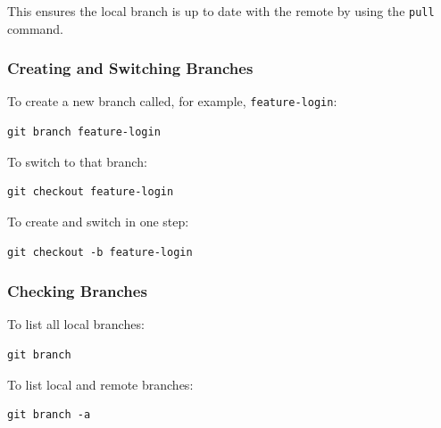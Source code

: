 \documentclass{article}
\newcommand{\codecmd}[1]{\textcolor[rgb]{0,0.5,0}{\texttt{#1}}}
\begin{document}
\noindent This ensures the local branch is up to date with the remote by using the \codecmd{pull} command.

\subsubsection{Creating and Switching Branches}

To create a new branch called, for example, \codecmd{feature-login}:

\begin{tcolorbox}[colback=mintgreen, colframe=green!40!black, boxrule=0.5pt, sharp corners]
\begin{verbatim}
git branch feature-login
\end{verbatim}
\end{tcolorbox}

\noindent To switch to that branch:

\begin{tcolorbox}[colback=mintgreen, colframe=green!40!black, boxrule=0.5pt, sharp corners]
\begin{verbatim}
git checkout feature-login
\end{verbatim}
\end{tcolorbox}

\noindent To create and switch in one step:

\begin{tcolorbox}[colback=mintgreen, colframe=green!40!black, boxrule=0.5pt, sharp corners]
\begin{verbatim}
git checkout -b feature-login
\end{verbatim}
\end{tcolorbox}

\subsubsection{Checking Branches}

To list all local branches:

\begin{tcolorbox}[colback=mintgreen, colframe=green!40!black, boxrule=0.5pt, sharp corners]
\begin{verbatim}
git branch
\end{verbatim}
\end{tcolorbox}

\noindent To list local and remote branches:

\begin{tcolorbox}[colback=mintgreen, colframe=green!40!black, boxrule=0.5pt, sharp corners]
\begin{verbatim}
git branch -a
\end{verbatim}
\end{tcolorbox}
\end{document}
